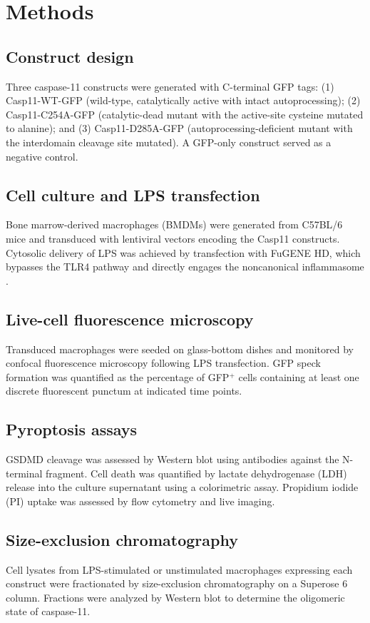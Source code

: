 \documentclass[11pt]{article}
\begin{document}
\section{Methods}

\subsection{Construct design}
Three caspase-11 constructs were generated with C-terminal GFP tags: (1) Casp11-WT-GFP (wild-type, catalytically active with intact autoprocessing); (2) Casp11-C254A-GFP (catalytic-dead mutant with the active-site cysteine mutated to alanine); and (3) Casp11-D285A-GFP (autoprocessing-deficient mutant with the interdomain cleavage site mutated). A GFP-only construct served as a negative control.

\subsection{Cell culture and LPS transfection}
Bone marrow-derived macrophages (BMDMs) were generated from C57BL/6 mice and transduced with lentiviral vectors encoding the Casp11 constructs. Cytosolic delivery of LPS was achieved by transfection with FuGENE HD, which bypasses the TLR4 pathway and directly engages the noncanonical inflammasome \citep{shi2014inflammatory}.

\subsection{Live-cell fluorescence microscopy}
Transduced macrophages were seeded on glass-bottom dishes and monitored by confocal fluorescence microscopy following LPS transfection. GFP speck formation was quantified as the percentage of GFP$^+$ cells containing at least one discrete fluorescent punctum at indicated time points.

\subsection{Pyroptosis assays}
GSDMD cleavage was assessed by Western blot using antibodies against the N-terminal fragment. Cell death was quantified by lactate dehydrogenase (LDH) release into the culture supernatant using a colorimetric assay. Propidium iodide (PI) uptake was assessed by flow cytometry and live imaging.

\subsection{Size-exclusion chromatography}
Cell lysates from LPS-stimulated or unstimulated macrophages expressing each construct were fractionated by size-exclusion chromatography on a Superose 6 column. Fractions were analyzed by Western blot to determine the oligomeric state of caspase-11.
\end{document}
